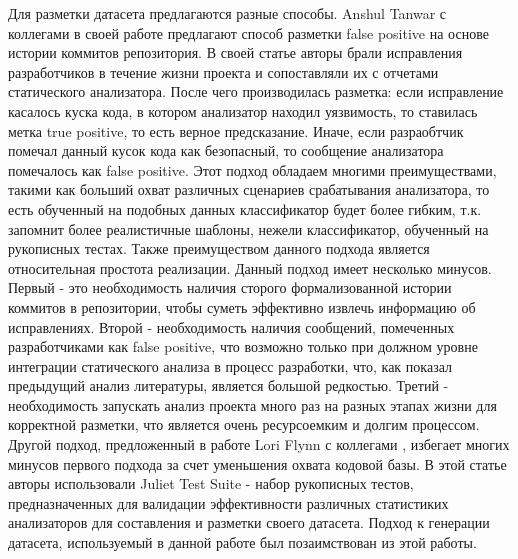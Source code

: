 Для разметки датасета предлагаются разные способы. Anshul Tanwar с коллегами в своей работе \cite{assesing-validity-of-sa-warnings-cisco} предлагают способ разметки false positive на основе истории коммитов репозитория. В своей статье авторы брали исправления разработчиков в течение жизни проекта и сопоставляли их с отчетами статического анализатора. После чего производилась разметка: если исправление касалось куска кода, в котором анализатор находил уязвимость, то ставилась метка true positive, то есть верное предсказание. Иначе, если разраобтчик помечал данный кусок кода как безопасный, то сообщение анализатора помечалось как false positive. Этот подход обладаем многими преимуществами, такими как больший охват различных сценариев срабатывания анализатора, то есть обученный на подобных данных классификатор будет более гибким, т.к. запомнит более реалистичные шаблоны, нежели классификатор, обученный на рукописных тестах. Также преимуществом данного подхода является относительная простота реализации. Данный подход имеет несколько минусов. Первый - это необходимость наличия сторого формализованной истории коммитов в репозитории, чтобы суметь эффективно извлечь информацию об исправлениях. Второй - необходимость наличия сообщений, помеченных разработчиками как false positive, что возможно только при должном уровне интеграции статического анализа в процесс разработки, что, как показал предыдущий анализ литературы, является большой редкостью. Третий - необходимость запускать анализ проекта много раз на разных этапах жизни для корректной разметки, что является очень ресурсоемким и долгим процессом. Другой подход, предложенный в работе Lori Flynn с коллегами \cite{test-suites-for-dataset}, избегает многих минусов первого подхода за счет уменьшения охвата кодовой базы. В этой статье авторы использовали Juliet Test Suite - набор рукописных тестов, предназначенных для валидации эффективности различных статистиких анализаторов\cite{Juliet} для составления и разметки своего датасета. Подход к генерации датасета, используемый в данной работе был позаимствован из этой работы.

\newpage